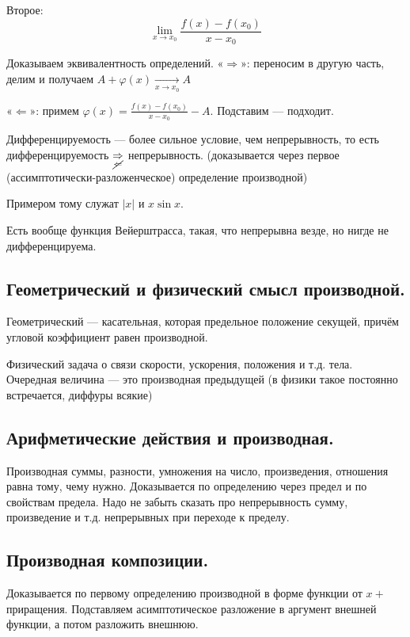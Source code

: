 \documentclass[12pt, a4paper]{article}
\begin{document}
Второе:
\begin{equation}
    \lim_{x \rightarrow x_{0}} \frac{f(x)-f\left(x_{0}\right)}{x-x_{0}}
\end{equation}

Доказываем эквивалентность определений.
«$\Rightarrow$»: переносим в другую часть, делим и получаем $A+\varphi(x) \underset{x \rightarrow x_{0}}{\longrightarrow} A$

«$\Leftarrow$»: примем $\varphi(x)=\frac{f(x)-f\left(x_{0}\right)}{x-x_{0}}-A$. Подставим — подходит.

Дифференцируемость — более сильное условие, чем непрерывность, то есть дифференцируемость $\underset{\cancel{\Leftarrow}}{\Rightarrow}$ непрерывность.
(доказывается через первое (ассимптотически-разложенческое) определение производной)

Примером тому служат $|x|$ и $x \sin x$.

Есть вообще функция Вейерштрасса, такая, что непрерывна везде, но нигде не дифференцируема.

\subsection{Геометрический и физический смысл производной.}

Геометрический — касательная, которая предельное положение секущей, причём угловой коэффициент равен производной.

Физический задача о связи скорости, ускорения, положения и т.д. тела. 
Очередная величина — это производная предыдущей (в физики такое постоянно встречается, диффуры всякие)

\subsection{Арифметические действия и производная.}

Производная суммы, разности, умножения на число, произведения, отношения равна тому, чему нужно.
Доказывается по определению через предел и по свойствам предела. 
Надо не забыть сказать про непрерывность сумму, произведение и т.д. непрерывных при переходе к пределу.

\subsection{Производная композиции.}

Доказывается по первому определению производной в форме функции от $x +$ приращения.
Подставляем асимптотическое разложение в аргумент внешней функции, а потом разложить внешнюю.
\end{document}
